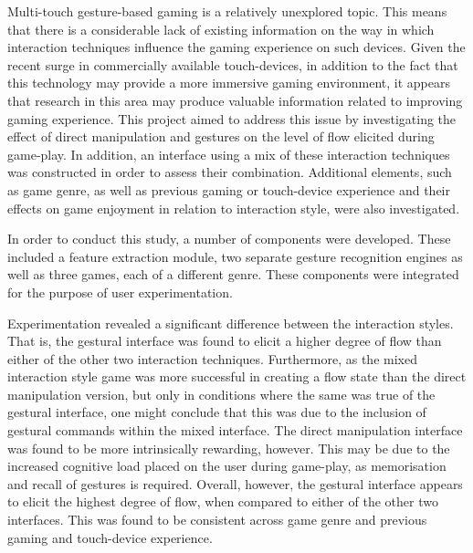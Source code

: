 Multi-touch gesture-based gaming is a relatively unexplored topic. This means that there is a considerable lack of existing information on the way in which interaction techniques influence the gaming experience on such devices. Given the recent surge in commercially available touch-devices, in addition to the fact that this technology may provide a more immersive gaming environment, it appears that research in this area may produce valuable information related to improving gaming experience. This project aimed to address this issue by investigating the effect of direct manipulation and gestures on the level of flow elicited during game-play. In addition, an interface using a mix of these interaction techniques was constructed in order to assess their combination. Additional elements, such as game genre, as well as previous gaming or touch-device experience and their effects on game enjoyment in relation to interaction style, were also investigated.

In order to conduct this study, a number of components were developed. These included a feature extraction module, two separate gesture recognition engines as well as three games, each of a different genre. These components were integrated for the purpose of user experimentation.

Experimentation revealed a significant difference between the interaction styles. That is, the gestural interface was found to elicit a higher degree of flow than either of the other two interaction techniques. Furthermore, as the mixed interaction style game was more successful in creating a flow state than the direct manipulation version, but only in conditions where the same was true of the gestural interface, one might conclude that this was due to the inclusion of gestural commands within the mixed interface. The direct manipulation interface was found to be more intrinsically rewarding, however. This may be due to the increased cognitive load placed on the user during game-play, as memorisation and recall of gestures is required. Overall, however, the gestural interface appears to elicit the highest degree of flow, when compared to either of the other two interfaces. This was found to be consistent across game genre and previous gaming and touch-device experience.

